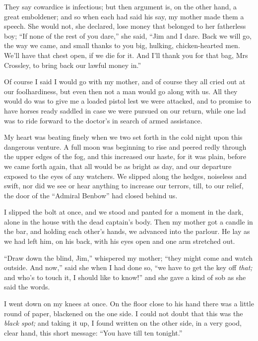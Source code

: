 They say cowardice is infectious; but then argument is, on the other hand, a great emboldener; and so when each had said his say, my mother made them a speech. She would not, she declared, lose money that belonged to her fatherless boy; \enquote{If none of the rest of you dare,} she said, \enquote{Jim and I dare. Back we will go, the way we came, and small thanks to you big, hulking, chicken-hearted men. We’ll have that chest open, if we die for it. And I’ll thank you for that bag, Mrs Crossley, to bring back our lawful money in.}

Of course I said I would go with my mother, and of course they all cried out at our foolhardiness, but even then not a man would go along with us. All they would do was to give me a loaded pistol lest we were attacked, and to promise to have horses ready saddled in case we were pursued on our return, while one lad was to ride forward to the doctor’s in search of armed assistance.

My heart was beating finely when we two set forth in the cold night upon this dangerous venture. A full moon was beginning to rise and peered redly through the upper edges of the fog, and this increased our haste, for it was plain, before we came forth again, that all would be as bright as day, and our departure exposed to the eyes of any watchers. We slipped along the hedges, noiseless and swift, nor did we see or hear anything to increase our terrors, till, to our relief, the door of the \enquote{Admiral Benbow} had closed behind us.

I slipped the bolt at once, and we stood and panted for a moment in the dark, alone in the house with the dead captain’s body. Then my mother got a candle in the bar, and holding each other’s hands, we advanced into the parlour. He lay as we had left him, on his back, with his eyes open and one arm stretched out.

\enquote{Draw down the blind, Jim,} whispered my mother; \enquote{they might come and watch outside. And now,} said she when I had done so, \enquote{we have to get the key off \textit{that;} and who’s to touch it, I should like to know!} and she gave a kind of sob as she said the words.

I went down on my knees at once. On the floor close to his hand there was a little round of paper, blackened on the one side. I could not doubt that this was the \textit{black spot;} and taking it up, I found written on the other side, in a very good, clear hand, this short message: \enquote{You have till ten tonight.}

